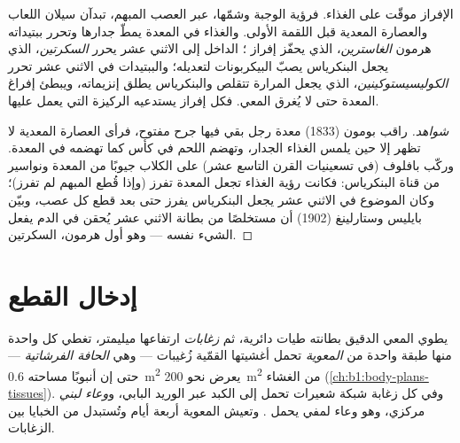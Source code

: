 \begin{proposition}\label{prop:b1:digestion-absorption:control}
الإفراز موقّت على الغذاء. فرؤية الوجبة وشمّها، عبر العصب المبهم،
تبدآن سيلان اللعاب والعصارة المعدية قبل اللقمة الأولى. والغذاء في
المعدة يمطّ جدارها وتحرر ببتيداته هرمون \emph{الغاسترين}، الذي
يحفّز إفراز ؛  الداخل إلى الاثني عشر يحرر
\emph{السكرتين}، الذي يجعل البنكرياس يصبّ البيكربونات لتعديله؛
 والببتيدات في الاثني عشر تحرر \emph{الكوليسيستوكينين}، الذي
يجعل المرارة تتقلص والبنكرياس يطلق إنزيماته، ويبطئ إفراغ المعدة
حتى لا يُغرق المعي. فكل إفراز يستدعيه الركيزة التي يعمل عليها.
\end{proposition}
\begin{proof}[شواهد]
راقب بومون (1833) معدة رجل بقي فيها جرح مفتوح، فرأى العصارة
المعدية لا تظهر إلا حين يلمس الغذاء الجدار، وتهضم اللحم في كأس كما
تهضمه في المعدة. وركّب بافلوف (في تسعينيات القرن التاسع عشر) على
الكلاب جيوبًا من المعدة ونواسير من قناة البنكرياس: فكانت رؤية
الغذاء تجعل المعدة تفرز (وإذا قُطع المبهم لم تفرز)؛ وكان 
الموضوع في الاثني عشر يجعل البنكرياس يفرز حتى بعد قطع كل عصب، وبيّن
بايليس وستارلينغ (1902) أن مستخلصًا من بطانة الاثني عشر يُحقن في
الدم يفعل الشيء نفسه --- وهو أول هرمون، السكرتين.
\end{proof}

\section{إدخال القطع}

\begin{definition}\label{def:b1:digestion-absorption:surface}
يطوي المعي الدقيق بطانته طيات دائرية، ثم \emph{زغابات} ارتفاعها
ميليمتر، تغطي كل واحدة منها طبقة واحدة من \emph{ المعوية}
تحمل أغشيتها القمّية زُغيبات --- وهي \emph{الحافة الفرشاتية} ---
حتى إن أنبوبًا مساحته \qty{0.6}{m^2} يعرض نحو
\qty{200}{m^2} من الغشاء (\cref{ch:b1:body-plans-tissues}). وفي
كل زغابة شبكة شعيرات تحمل   إلى الكبد عبر
الوريد البابي، و\emph{وعاء لبني} مركزي، وهو وعاء لمفي يحمل .
وتعيش  المعوية أربعة أيام وتُستبدل من الخبايا بين الزغابات.
\end{definition}

